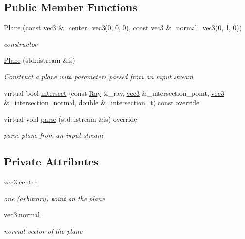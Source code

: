 \subsection*{Public Member Functions}
\begin{DoxyCompactItemize}
\item 
\hyperlink{classPlane_a6ce42dd3bf06b497256454534f582a80}{Plane} (const \hyperlink{classvec3}{vec3} \&\+\_\+center=\hyperlink{classvec3}{vec3}(0, 0, 0), const \hyperlink{classvec3}{vec3} \&\+\_\+normal=\hyperlink{classvec3}{vec3}(0, 1, 0))
\begin{DoxyCompactList}\small\item\em constructor \end{DoxyCompactList}\item 
\hyperlink{classPlane_a5236597c4a6324126e8746ecb4af1535}{Plane} (std\+::istream \&is)
\begin{DoxyCompactList}\small\item\em Construct a plane with parameters parsed from an input stream. \end{DoxyCompactList}\item 
virtual bool \hyperlink{classPlane_ab146bb10ad52e8535dad25d531c43b86}{intersect} (const \hyperlink{classRay}{Ray} \&\+\_\+ray, \hyperlink{classvec3}{vec3} \&\+\_\+intersection\+\_\+point, \hyperlink{classvec3}{vec3} \&\+\_\+intersection\+\_\+normal, double \&\+\_\+intersection\+\_\+t) const override
\item 
virtual void \hyperlink{classPlane_af5361222d1aa404fc720d7b4b68a634c}{parse} (std\+::istream \&is) override
\begin{DoxyCompactList}\small\item\em parse plane from an input stream \end{DoxyCompactList}\end{DoxyCompactItemize}
\subsection*{Private Attributes}
\begin{DoxyCompactItemize}
\item 
\hyperlink{classvec3}{vec3} \hyperlink{classPlane_a366eef1f4daccfc48ccd824cca63a026}{center}
\begin{DoxyCompactList}\small\item\em one (arbitrary) point on the plane \end{DoxyCompactList}\item 
\hyperlink{classvec3}{vec3} \hyperlink{classPlane_ac3a6d80b28df1dd0ef7867663227c937}{normal}
\begin{DoxyCompactList}\small\item\em normal vector of the plane \end{DoxyCompactList}\end{DoxyCompactItemize}
